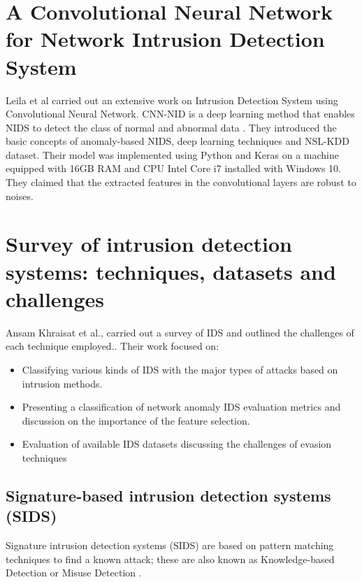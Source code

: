 \documentclass[conference]{IEEEtran}
\begin{document}
\section{A Convolutional Neural Network for Network Intrusion Detection System}
Leila et al carried out an extensive work on Intrusion Detection System using Convolutional Neural Network. CNN-NID is a deep learning method that enables NIDS to detect the class of normal and abnormal data \cite{Mohammadpour2018}.
They introduced the basic concepts of anomaly-based NIDS, deep learning techniques and NSL-KDD dataset. Their model was implemented using Python and Keras on a machine equipped with 16GB RAM and CPU Intel Core i7 installed with Windows 10. They claimed that the extracted features in the convolutional layers are robust to noises.

\section{Survey of intrusion detection systems:
techniques, datasets and challenges}
     Ansam Khraisat et al., carried out a survey of IDS and outlined the challenges of each technique employed.\cite{Khraisat2019}. Their work focused on:
     \begin{itemize}
         \item Classifying various kinds of IDS with the major types of attacks based on intrusion methods.
        \item Presenting a classification of network anomaly IDS evaluation metrics and discussion on the importance of the feature selection.
        \item Evaluation of available IDS datasets discussing the
challenges of evasion techniques
     \end{itemize}
     \subsection{Signature-based intrusion detection systems (SIDS)}
     Signature intrusion detection systems (SIDS) are based on pattern matching techniques to find a known attack; these are also known as Knowledge-based Detection or Misuse Detection \cite{Khraisat2019}.
\end{document}
